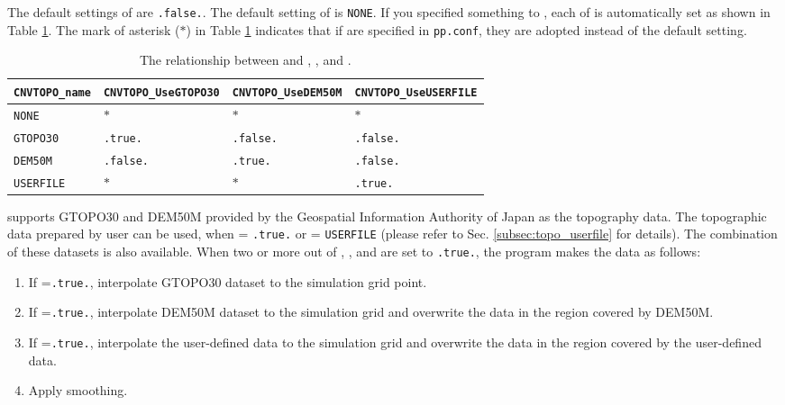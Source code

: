 The default settings of  are \verb|.false.|.
The default setting of  is \verb|NONE|.
If you specified something to ,
each of  is automatically set as shown in Table \ref{tab:cvntopo_name}.
The mark of asterisk ($\ast$) in Table \ref{tab:cvntopo_name} indicates that
if  are specified in \verb|pp.conf|,
they are adopted instead of the default setting.

\begin{table}[tbh]
\begin{center}
\caption{The relationship between  and , , and .}
\begin{tabularx}{150mm}{X|l|l|l} \hline
  \rowcolor[gray]{0.9} \verb|CNVTOPO_name| & \verb|CNVTOPO_UseGTOPO30| & \verb|CNVTOPO_UseDEM50M| & \verb|CNVTOPO_UseUSERFILE| \\ \hline
                       \verb|NONE|           & $\ast$         & $\ast$         & $\ast$          \\ \hline
                       \verb|GTOPO30|        & \verb|.true.|  & \verb|.false.| & \verb|.false.|  \\ \hline
                       \verb|DEM50M|         & \verb|.false.| & \verb|.true.|  & \verb|.false.|  \\ \hline
                       \verb|USERFILE|       & $\ast$         & $\ast$         & \verb|.true.|   \\ \hline
\end{tabularx}
\label{tab:cvntopo_name}
\end{center}
\end{table}


\scalerm supports GTOPO30 and DEM50M provided by the Geospatial Information Authority of Japan as the topography data.
The topographic data prepared by user can be used, when  = \verb|.true.| or  = \verb|USERFILE| (please refer to Sec. \ref{subsec:topo_userfile} for details).
The combination of these datasets is also available.
When two or more out of , , and  are set to \verb|.true.|,
the program makes the data as follows:
\begin{enumerate}[1)]
 \item If =\verb|.true.|,  interpolate GTOPO30 dataset to the simulation grid point.
 \item If =\verb|.true.|,   interpolate DEM50M dataset to the simulation grid and overwrite the data in the region covered by DEM50M.
 \item If =\verb|.true.|, interpolate the user-defined data to the simulation grid and overwrite the data in the region covered by the user-defined data.
 \item Apply smoothing.
\end{enumerate}



